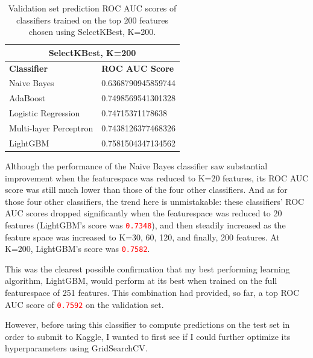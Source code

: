 \documentclass[12pt, letterpaper]{article}
\begin{document}
\begin{table}[h!]
  \centering
  {
  \begin{tabular}{|| l | l ||}
   \hline
   \multicolumn{2}{|c|}{SelectKBest, K=200} \\
   \hline
   \rowcolor{white} \textbf{Classifier} & \textbf{ROC AUC Score} \\ [0.5ex]
   \hline\hline
   Naive Bayes & 0.6368790945859744 \\
   \hline
   AdaBoost & 0.7498569541301328 \\
   \hline
   Logistic Regression & 0.74715371178638 \\
   \hline
   Multi-layer Perceptron & 0.7438126377468326 \\
   \hline
   LightGBM & 0.7581504347134562 \\ [1ex]
   \hline
  \end{tabular}
 }
 \caption{Validation set prediction ROC AUC scores of classifiers trained on the top 200 features chosen using SelectKBest, K=200.}
 \label{table:7}
\end{table}

Although the performance of the Naive Bayes classifier saw substantial improvement when the featurespace was reduced to K=20 features, its ROC AUC score was still much lower than those of the four other classifiers. And as for those four other classifiers, the trend here is unmistakable: these classifiers' ROC AUC scores dropped significantly when the featurespace was reduced to 20 features (LightGBM's score was \colorbox{backcolor}{\textcolor{red}{\texttt{0.7348}}}), and then steadily increased as the feature space was increased to K=30, 60, 120, and finally, 200 features. At K=200, LightGBM's score was \colorbox{backcolor}{\textcolor{red}{\texttt{0.7582}}}.

This was the clearest possible confirmation that my best performing learning algorithm, LightGBM, would perform at its best when trained on the full featurespace of 251 features. This combination had provided, so far, a top ROC AUC score of \colorbox{backcolor}{\textcolor{red}{\texttt{0.7592}}} on the validation set.

However, before using this classifier to compute predictions on the test set in order to submit to Kaggle, I wanted to first see if I could further optimize its hyperparameters using GridSearchCV.
\end{document}
